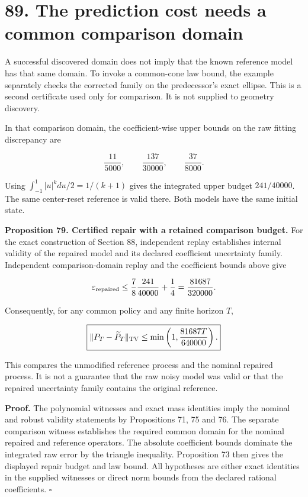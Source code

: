 \documentclass[11pt,letterpaper]{article}
\begin{document}
\section{89. The prediction cost needs a common comparison
domain}\label{the-prediction-cost-needs-a-common-comparison-domain}

A successful discovered domain does not imply that the known reference
model has that same domain. To invoke a common-cone law bound, the
example separately checks the corrected family on the predecessor's
exact ellipse. This is a second certificate used only for comparison. It
is not supplied to geometry discovery.

In that comparison domain, the coefficient-wise upper bounds on the raw
fitting discrepancy are

\[
\frac{11}{5000},\qquad \frac{137}{30000},\qquad \frac{37}{8000}.
\]

Using \(\int_{-1}^1|u|^kdu/2=1/(k+1)\) gives the integrated upper budget
\(241/40000\). The same center-reset reference is valid there. Both
models have the same initial state.

\textbf{Proposition 79. Certified repair with a retained comparison
budget.} For the exact construction of Section 88, independent replay
establishes internal validity of the repaired model and its declared
coefficient uncertainty family. Independent comparison-domain replay and
the coefficient bounds above give

\[
\varepsilon_{\rm repaired}
\leq\frac78\frac{241}{40000}+\frac14
=\frac{81687}{320000}.
\]

Consequently, for any common policy and any finite horizon \(T\),

\[
\boxed{
\|P_T-\widetilde P_T\|_{\rm TV}
\leq\min\left(1,\frac{81687T}{640000}\right).
}
\]

This compares the unmodified reference process and the nominal repaired
process. It is not a guarantee that the raw noisy model was valid or
that the repaired uncertainty family contains the original reference.

\textbf{Proof.} The polynomial witnesses and exact mass identities imply
the nominal and robust validity statements by Propositions 71, 75 and
76. The separate comparison witness establishes the required common
domain for the nominal repaired and reference operators. The absolute
coefficient bounds dominate the integrated raw error by the triangle
inequality. Proposition 73 then gives the displayed repair budget and
law bound. All hypotheses are either exact identities in the supplied
witnesses or direct norm bounds from the declared rational coefficients.
\(\square\)
\end{document}
